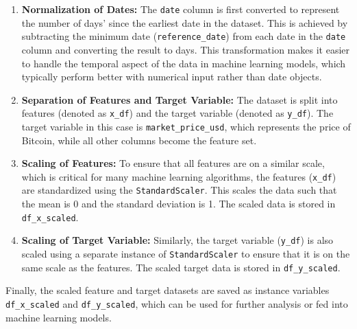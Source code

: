 \begin{enumerate}
    \item \textbf{Normalization of Dates:} The \texttt{date} column is first converted to represent the number of days'
                                           since the earliest date in the dataset. This is achieved by subtracting the
                                           minimum date (\texttt{reference\_date}) from each date in the \texttt{date}
                                           column and converting the result to days. This transformation makes it easier
                                           to handle the temporal aspect of the data in machine learning models, which
                                           typically perform better with numerical input rather than date objects.
    \item \textbf{Separation of Features and Target Variable:} The dataset is split into features (denoted as \texttt{x\_df})
                                                               and the target variable (denoted as \texttt{y\_df}). The target
                                                               variable in this case is \texttt{market\_price\_usd}, which
                                                               represents the price of Bitcoin, while all other columns become
                                                               the feature set.
    \item \textbf{Scaling of Features:} To ensure that all features are on a similar scale, which is critical for many machine
                                        learning algorithms, the features (\texttt{x\_df}) are standardized using the
                                        \texttt{StandardScaler}. This scales the data such that the mean is 0 and the standard
                                        deviation is 1. The scaled data is stored in \texttt{df\_x\_scaled}.
    \item \textbf{Scaling of Target Variable:} Similarly, the target variable (\texttt{y\_df}) is also scaled using a separate
                                               instance of \texttt{StandardScaler} to ensure that it is on the same scale as
                                               the features. The scaled target data is stored in \texttt{df\_y\_scaled}.
\end{enumerate}

Finally, the scaled feature and target datasets are saved as instance variables \texttt{df\_x\_scaled} and \texttt{df\_y\_scaled},
which can be used for further analysis or fed into machine learning models.

